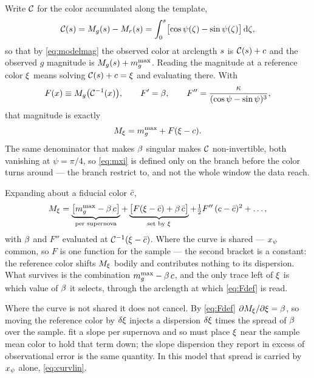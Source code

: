 \documentclass[11pt]{article}
\theoremstyle{plain}
\begin{document}
Write $\mathcal{C}$ for the color accumulated along the template,
\begin{equation}
  \mathcal{C}(s) = M_{g}(s) - M_{r}(s)
    = \int_{0}^{s}\bigl[\cos\psi(\zeta) - \sin\psi(\zeta)\bigr]\,\mathrm{d}\zeta ,
  \label{eq:colfn}
\end{equation}
so that by \eqref{eq:modelmag} the observed color at arclength $s$ is
$\mathcal{C}(s) + c$ and the observed $g$ magnitude is $M_{g}(s) + m_{g}^{\max}$. Reading
the magnitude at a reference color $\xi$ means solving $\mathcal{C}(s) + c = \xi$
and evaluating there. With
\begin{equation}
  F(x) \equiv M_{g}\bigl(\mathcal{C}^{-1}(x)\bigr) , \qquad
  F' = \beta , \qquad
  F'' = \frac{\kappa}{(\cos\psi - \sin\psi)^{3}} ,
  \label{eq:Fdef}
\end{equation}
that magnitude is exactly
\begin{equation}
  M_{\xi} = m_{g}^{\max} + F(\xi - c) .
  \label{eq:mxi}
\end{equation}
The same denominator that makes $\beta$ singular makes $\mathcal{C}$ non-invertible, both
vanishing at $\psi = \pi/4$, so \eqref{eq:mxi} is defined only on the branch before the
color turns around --- the branch \citet{Wang2003} restrict to, and not the whole window
the data reach.

Expanding about a fiducial color $\bar{c}$,
\begin{equation}
  M_{\xi}
    = \underbrace{\bigl[m_{g}^{\max} - \beta\,c\bigr]}_{\text{per supernova}}
    + \underbrace{\bigl[F(\xi - \bar{c}) + \beta\,\bar{c}\bigr]}_{\text{set by }\xi}
    + \tfrac{1}{2}F''\,(c - \bar{c})^{2} + \dots ,
  \label{eq:mxiexp}
\end{equation}
with $\beta$ and $F''$ evaluated at $\mathcal{C}^{-1}(\xi - \bar{c})$. Where the curve
is shared --- $x_{\psi}$ common, so $F$ is one function for the sample --- the second
bracket is a constant: the reference color shifts $M_{\xi}$ bodily and contributes
nothing to its dispersion. What survives is the combination $m_{g}^{\max} - \beta\,c$,
and the only trace left of $\xi$ is which value of $\beta$ it selects, through the
arclength at which \eqref{eq:Fdef} is read.

Where the curve is not shared it does not cancel. By \eqref{eq:Fdef}
$\partial M_{\xi}/\partial\xi = \beta$, so moving the reference color by
$\delta\xi$ injects a dispersion $\delta\xi$ times the spread of $\beta$ over
the sample. \citet{Wang2003} fit a slope per supernova and so must place $\xi$ near the
sample mean color to hold that term down; the slope dispersion they report in excess of
observational error is the same quantity. In this model that spread is carried by
$x_{\psi}$ alone, \eqref{eq:curvlin}.
\end{document}
